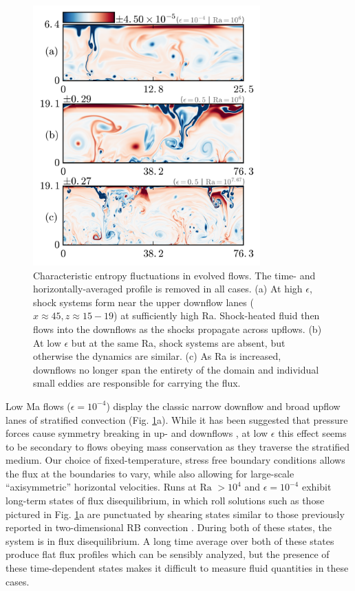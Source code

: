 \documentclass[aps, prl, twocolumn, nofootinbib, groupedaddress, amsfonts, amssymb, amsmath]{revtex4-1}
\begin{document}
\begin{figure}[t]
\includegraphics[width=3.4375in]{./figs/snapshots_fig.png}
\caption{Characteristic entropy fluctuations in evolved flows. 
The time- and horizontally-averaged profile is removed in all cases.  
(a) At high $\epsilon$, shock systems form near the upper downflow lanes 
($x \approx 45, z \approx 15-19$) at sufficiently high Ra.
Shock-heated fluid then flows into the downflows as the shocks propagate across upflows.
(b) At low $\epsilon$ but at the same Ra, shock systems are absent, 
but otherwise the dynamics are similar.  
(c) As Ra is increased, downflows no longer span
the entirety of the domain and individual 
small eddies are responsible for carrying the flux.
\label{fig:entropy_snapshots} }
\end{figure}

Low Ma flows ($\epsilon = 10^{-4}$)
display the classic narrow downflow and broad upflow lanes of stratified
convection (Fig. \ref{fig:entropy_snapshots}a).
While it has been suggested that pressure forces 
cause symmetry breaking in up- and downflows
\cite{hurlburt&all1984}, at low $\epsilon$ this 
effect seems to be secondary to flows obeying mass conservation as they traverse
the stratified medium.  
Our choice of fixed-temperature, stress free boundary conditions 
allows the flux at the boundaries to vary, while also allowing
for large-scale ``axisymmetric'' horizontal velocities.
Runs at $\text{Ra }> 10^4$
and $\epsilon = 10^{-4}$ exhibit long-term states of
flux disequilibrium, in which roll solutions such as those pictured in 
Fig. \ref{fig:entropy_snapshots}a
are punctuated by shearing states similar to those previously
reported in two-dimensional RB convection \cite{goluskin&all2014}.  
During both of these states, the system is in flux disequilibrium.
A long time average
over both of these states produce flat flux profiles which
can be sensibly analyzed, but the presence of these time-dependent states
makes it difficult to measure fluid quantities in these cases.
\end{document}
